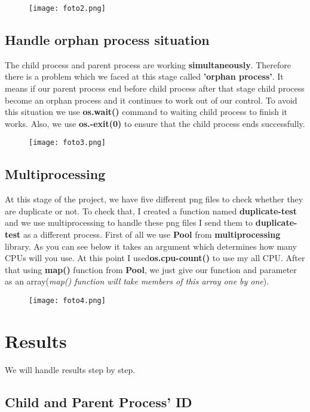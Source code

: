 \documentclass[onecolumn]{article}
\begin{document}
\begin{figure}[h]
\texttt{[image: foto2.png]}
\centering
\end{figure}

\subsection{Handle orphan process situation}
The child process and parent process are working \textbf{simultaneously}. Therefore there is a problem which we faced at this stage called \textbf{'orphan process'}. It means if our parent process end before child process after that stage child process become an orphan process and it continues to work out of our control. To avoid this situation we use \textbf{os.wait()} command to waiting child process to finish it works. Also, we use \textbf{os.-exit(0)} to ensure that the child process ends successfully.\newline


\begin{figure}[h]
\texttt{[image: foto3.png]}
\centering
\end{figure}

\subsection{Multiprocessing}
At this stage of the project, we have five different png files to check whether they are duplicate or not. To check that, I created a function named \textbf{duplicate-test} and we use multiprocessing to handle these png files I send them to \textbf{duplicate-test} as a different process. First of all we use \textbf{Pool} from \textbf{multiprocessing} library. As you can see below it takes an argument which determines how many CPUs will you use. At this point I used\textbf{os.cpu-count()} to use my all CPU. After that using \textbf{map()} function from \textbf{Pool}, we just give our function and parameter as an array(\emph{map() function will take members of this array one by one}).


\begin{figure}[h]
\texttt{[image: foto4.png]}
\centering
\end{figure}


\section{Results}
We will handle results step by step.

\subsection{Child and Parent Process' ID}
\end{document}
